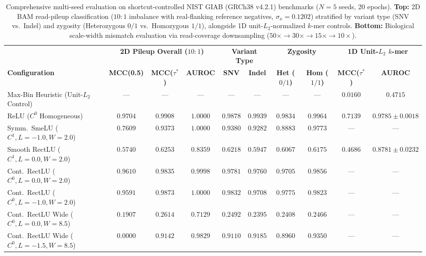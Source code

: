 \documentclass[10pt,a4paper]{article}
\begin{document}
\begin{table}[t]
\centering
\caption{Comprehensive multi-seed evaluation on shortcut-controlled NIST GIAB (GRCh38 v4.2.1) benchmarks ($N=5$ seeds, 20 epochs). \textbf{Top:} 2D BAM read-pileup classification ($10:1$ imbalance with real-flanking reference negatives, $\sigma_x=0.1202$) stratified by variant type (SNV vs.\ Indel) and zygosity (Heterozygous $0/1$ vs.\ Homozygous $1/1$), alongside 1D unit-$L_2$-normalized $k$-mer controls. \textbf{Bottom:} Biological scale-width mismatch evaluation via read-coverage downsampling ($50\times \to 30\times \to 15\times \to 10\times$).}
\label{tab:real_giab_stratified}
\footnotesize
\setlength{\tabcolsep}{4pt}
\renewcommand{\arraystretch}{1.05}
\begin{tabular}{lccccccccc}
\toprule
& \multicolumn{3}{c}{\textbf{2D Pileup Overall ($10:1$)}} & \multicolumn{2}{c}{\textbf{Variant Type}} & \multicolumn{2}{c}{\textbf{Zygosity}} & \multicolumn{2}{c}{\textbf{1D Unit-$L_2$ $k$-mer}} \\
\cmidrule(lr){2-4} \cmidrule(lr){5-6} \cmidrule(lr){7-8} \cmidrule(lr){9-10}
\textbf{Configuration} & \textbf{MCC(0.5)} & \textbf{MCC($\tau^*$)} & \textbf{AUROC} & \textbf{SNV} & \textbf{Indel} & \textbf{Het ($0/1$)} & \textbf{Hom ($1/1$)} & \textbf{MCC($\tau^*$)} & \textbf{AUROC} \\
\midrule
Max-Bin Heuristic (Unit-$L_2$ Control) & --- & --- & --- & --- & --- & --- & --- & $0.0160$ & $0.4715$ \\
ReLU ($C^0$ Homogeneous) & $0.9704$ & $0.9908$ & $1.0000$ & $0.9878$ & $0.9939$ & $0.9834$ & $0.9964$ & $0.7139$ & $0.9785 \pm 0.0018$ \\
Symm.\ SmeLU ($C^1, L=-1.0, W=2.0$) & $0.7609$ & $0.9373$ & $1.0000$ & $0.9380$ & $0.9282$ & $0.8883$ & $0.9773$ & --- & --- \\
Smooth RectLU ($C^1, L=0.0, W=2.0$) & $0.5740$ & $0.6253$ & $0.8359$ & $0.6218$ & $0.5947$ & $0.6067$ & $0.6175$ & $0.4686$ & $0.8781 \pm 0.0232$ \\
Cont.\ RectLU ($C^0, L=0.0, W=2.0$) & $0.9610$ & $0.9835$ & $0.9998$ & $0.9781$ & $0.9760$ & $0.9705$ & $0.9856$ & --- & --- \\
Cont.\ RectLU ($C^0, L=-1.0, W=2.0$) & $0.9591$ & $0.9873$ & $1.0000$ & $0.9832$ & $0.9708$ & $0.9775$ & $0.9823$ & --- & --- \\
Cont.\ RectLU Wide ($C^0, L=0.0, W=8.5$) & $0.1907$ & $0.2614$ & $0.7129$ & $0.2492$ & $0.2395$ & $0.2408$ & $0.2466$ & --- & --- \\
Cont.\ RectLU Wide ($C^0, L=-1.5, W=8.5$) & $0.0000$ & $0.9142$ & $\mathbf{0.9829}$ & $0.9110$ & $0.9185$ & $0.8960$ & $0.9350$ & --- & --- \\

\end{tabular}
\end{table}
\end{document}
